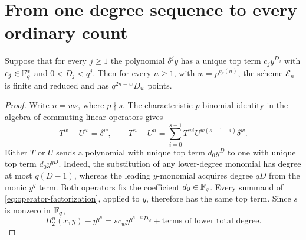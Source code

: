 \section{From one degree sequence to every ordinary count}\label{sec:conversion}

\begin{proposition}\label{prop:conversion}
Suppose that for every $j\ge1$ the polynomial $\delta^j y$ has a unique
top term $c_jy^{D_j}$ with $c_j\in\mathbb F_q^*$ and $0<D_j<q^j$.
Then for every $n\ge1$, with $w=p^{v_p(n)}$, the scheme
$\mathcal E_n$ is finite and reduced and has $q^{2n-w}D_w$ points.
\end{proposition}

\begin{proof}
Write $n=ws$, where $p\nmid s$. The characteristic-$p$ binomial
identity in the algebra of commuting linear operators gives
\begin{equation}\label{eq:operator-factorization}
 T^w-U^w=\delta^w,\qquad
 T^n-U^n=
 \sum_{i=0}^{s-1}T^{wi}U^{w(s-1-i)}\delta^w.
\end{equation}
Either $T$ or $U$ sends a polynomial with unique top term $d_0y^D$
to one with unique top term $d_0y^{qD}$. Indeed, the substitution
of any lower-degree monomial has degree at most $q(D-1)$, whereas
the leading $y$-monomial acquires degree $qD$ from the monic $y^q$
term. Both operators fix the coefficient $d_0\in\mathbb F_q$.
Every summand of \eqref{eq:operator-factorization}, applied to $y$,
therefore has the same top term. Since $s$ is nonzero in $\mathbb F_q$,
\begin{equation}\label{eq:second-leading}
 H_2^n(x,y)-y^{q^n}
 =s c_w y^{q^{n-w}D_w}
   +\text{terms of lower total degree}.
\end{equation}


\end{proof}

